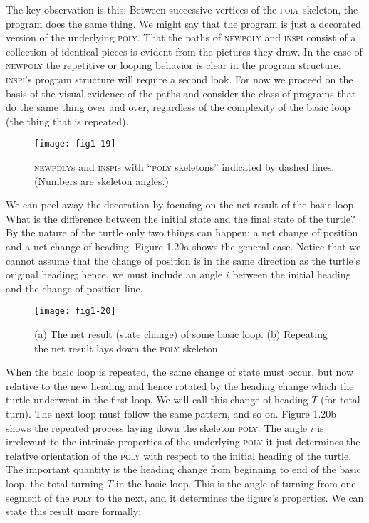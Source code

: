 \documentclass{book}
\begin{document}
The key observation is this: Between successive vertices of the \textsc{poly}
skeleton, the program does the same thing. We might say that the
program is just a decorated version of the underlying \textsc{poly}. That the
paths of \textsc{newpoly} and \textsc{inspi} consist of a collection of identical pieces
is evident from the pictures they draw. In the case of \textsc{newpoly} the
repetitive or looping behavior is clear in the program structure. \textsc{inspi}'s
program structure will require a second look. For now we proceed on
the basis of the visual evidence of the paths and consider the class
of programs that do the same thing over and over, regardless of the
complexity of the basic loop (the thing that is repeated).

\begin{figure}
\begin{center}
\texttt{[image: fig1-19]}
\caption{\textsc{newpdly}s and \textsc{inspi}s with ``\textsc{poly} skeletons'' indicated by dashed lines. (Numbers are skeleton angles.)}
\end{center}
\end{figure}

We can peel away the decoration by focusing on the net result of the
basic loop. What is the difference between the initial state and the final
state of the turtle? By the nature of the turtle only two things can
happen: a net change of position and a net change of heading. Figure
1.20a shows the general case. Notice that we cannot assume that the
change of position is in the same direction as the turtle's original heading;
hence, we must include an angle $i$ between the initial heading and the
change-of-position line.

\begin{figure}
\begin{center}
\texttt{[image: fig1-20]}
\caption{(a) The net result (state change) of some basic loop. (b) Repeating the net result
lays down the \textsc{poly} skeleton}
\end{center}
\end{figure}

When the basic loop is repeated, the same change of state must occur,
but now relative to the new heading and hence rotated by the heading
change which the turtle underwent in the first loop. We will call this
change of heading $T$ (for total turn). The next loop must follow the same
pattern, and so on. Figure 1.20b shows the repeated process laying down
the skeleton \textsc{poly}. The angle $i$ is irrelevant to the intrinsic properties of
the underlying \textsc{poly}-it just determines the relative orientation of the
\textsc{poly} with respect to the initial heading of the turtle. The important
quantity is the heading change from beginning to end of the basic loop,
the total turning $T$ in the basic loop. This is the angle of turning from
one segment of the \textsc{poly} to the next, and it determines the iigure's
properties. We can state this result more formally:
\end{document}
